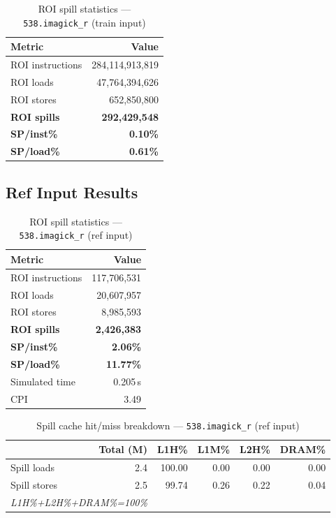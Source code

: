 \documentclass[11pt,a4paper]{article}
\begin{document}
\begin{table}[H]
\centering
\caption{ROI spill statistics --- \texttt{538.imagick\_r} (train input)}
\label{tab:imagick_train_roi}
\begin{tabular}{lr}
\toprule
\textbf{Metric} & \textbf{Value} \\
\midrule
ROI instructions & 284,114,913,819 \\
ROI loads        & 47,764,394,626 \\
ROI stores       & 652,850,800 \\
\textbf{ROI spills}   & \textbf{292,429,548} \\
\textbf{SP/inst\%}   & \textbf{0.10\%} \\
\textbf{SP/load\%}   & \textbf{0.61\%} \\
\bottomrule
\end{tabular}
\end{table}

\subsection{Ref Input Results}

\begin{table}[H]
\centering
\caption{ROI spill statistics --- \texttt{538.imagick\_r} (ref input)}
\label{tab:imagick_ref_roi}
\begin{tabular}{lr}
\toprule
\textbf{Metric} & \textbf{Value} \\
\midrule
ROI instructions & 117,706,531 \\
ROI loads        & 20,607,957 \\
ROI stores       & 8,985,593 \\
\textbf{ROI spills}   & \textbf{2,426,383} \\
\textbf{SP/inst\%}   & \textbf{2.06\%} \\
\textbf{SP/load\%}   & \textbf{11.77\%} \\
Simulated time   & 0.205\,s \\
CPI              & 3.49 \\
\bottomrule
\end{tabular}
\end{table}

\begin{table}[H]
\centering
\caption{Spill cache hit/miss breakdown --- \texttt{538.imagick\_r} (ref input)}
\label{tab:imagick_ref_cache}
\begin{tabular}{lrrrrr}
\toprule
\textbf{} & \textbf{Total (M)} & \textbf{L1H\%} & \textbf{L1M\%} & \textbf{L2H\%} & \textbf{DRAM\%} \\
\midrule
Spill loads  & 2.4 & 100.00 & 0.00 & 0.00 & 0.00 \\
Spill stores & 2.5 & 99.74 & 0.26 & 0.22 & 0.04 \\
\multicolumn{2}{l}{\small\textit{L1H\%+L2H\%+DRAM\%=100\%}} \\
\bottomrule
\end{tabular}
\end{table}
\end{document}
